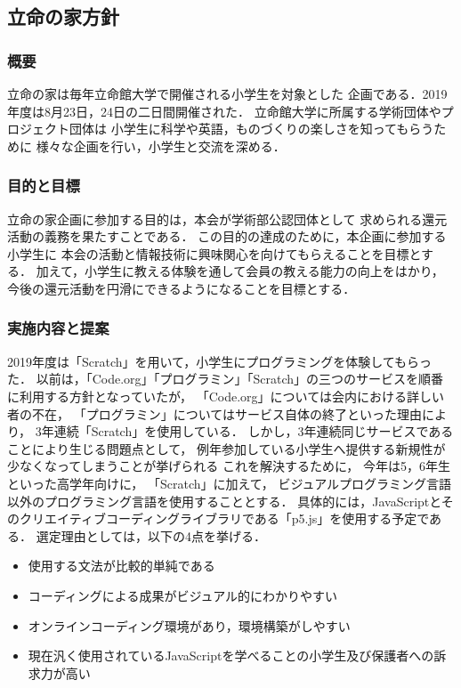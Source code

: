 \subsection*{立命の家方針}


\subsubsection*{概要}
立命の家は毎年立命館大学で開催される小学生を対象とした
企画である．2019年度は8月23日，24日の二日間開催された．
立命館大学に所属する学術団体やプロジェクト団体は
小学生に科学や英語，ものづくりの楽しさを知ってもらうために
様々な企画を行い，小学生と交流を深める．

\subsubsection*{目的と目標}
立命の家企画に参加する目的は，本会が学術部公認団体として
求められる還元活動の義務を果たすことである．
この目的の達成のために，本企画に参加する小学生に
本会の活動と情報技術に興味関心を向けてもらえることを目標とする．
加えて，小学生に教える体験を通して会員の教える能力の向上をはかり，
今後の還元活動を円滑にできるようになることを目標とする．

\subsubsection*{実施内容と提案}
2019年度は「Scratch」を用いて，小学生にプログラミングを体験してもらった．
以前は，「Code.org」「プログラミン」「Scratch」の三つのサービスを順番に利用する方針となっていたが，
「Code.org」については会内における詳しい者の不在，
「プログラミン」についてはサービス自体の終了といった理由により，
3年連続「Scratch」を使用している．
しかし，3年連続同じサービスであることにより生じる問題点として，
例年参加している小学生へ提供する新規性が少なくなってしまうことが挙げられる
これを解決するために，
今年は5，6年生といった高学年向けに，
「Scratch」に加えて，
ビジュアルプログラミング言語以外のプログラミング言語を使用することとする．
具体的には，JavaScriptとそのクリエイティブコーディングライブラリである「p5.js」を使用する予定である．
選定理由としては，以下の4点を挙げる．

\begin {itemize}
    \item 使用する文法が比較的単純である
    \item コーディングによる成果がビジュアル的にわかりやすい
    \item オンラインコーディング環境があり，環境構築がしやすい
    \item 現在汎く使用されているJavaScriptを学べることの小学生及び保護者への訴求力が高い
\end {itemize}

